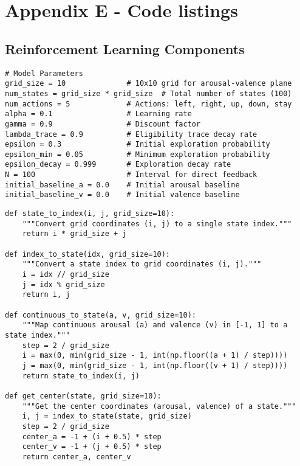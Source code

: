 \newpage
\section*{Appendix E - Code listings}
\label{app:code-listig}
\subsection*{Reinforcement Learning Components}
\label{sec:rl-code} %


\begin{lstlisting}[caption={Model Parameters},label={lst:parameters}]
# Model Parameters
grid_size = 10              # 10x10 grid for arousal-valence plane
num_states = grid_size * grid_size  # Total number of states (100)
num_actions = 5             # Actions: left, right, up, down, stay
alpha = 0.1                 # Learning rate
gamma = 0.9                 # Discount factor
lambda_trace = 0.9          # Eligibility trace decay rate
epsilon = 0.3               # Initial exploration probability
epsilon_min = 0.05          # Minimum exploration probability
epsilon_decay = 0.999       # Exploration decay rate
N = 100                     # Interval for direct feedback
initial_baseline_a = 0.0    # Initial arousal baseline
initial_baseline_v = 0.0    # Initial valence baseline
\end{lstlisting}

\begin{lstlisting}[caption={State and Coordinate Conversion},label={lst:state-conversion}]
def state_to_index(i, j, grid_size=10):
    """Convert grid coordinates (i, j) to a single state index."""
    return i * grid_size + j

def index_to_state(idx, grid_size=10):
    """Convert a state index to grid coordinates (i, j)."""
    i = idx // grid_size
    j = idx % grid_size
    return i, j

def continuous_to_state(a, v, grid_size=10):
    """Map continuous arousal (a) and valence (v) in [-1, 1] to a state index."""
    step = 2 / grid_size
    i = max(0, min(grid_size - 1, int(np.floor((a + 1) / step))))
    j = max(0, min(grid_size - 1, int(np.floor((v + 1) / step))))
    return state_to_index(i, j)

def get_center(state, grid_size=10):
    """Get the center coordinates (arousal, valence) of a state."""
    i, j = index_to_state(state, grid_size)
    step = 2 / grid_size
    center_a = -1 + (i + 0.5) * step
    center_v = -1 + (j + 0.5) * step
    return center_a, center_v
\end{lstlisting}


